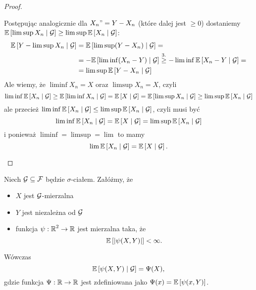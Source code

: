 \begin{proof}
\begin{enumerate}
      Postępując analogicznie dla $X_n"=Y-X_n$ (które dalej jest $\geq0$) dostaniemy $\expected{\limsup X_n}{\set{G}}\geq\limsup\expected{X_n}{\set{G}}$:
      \begin{align*}
        \expected{Y-\limsup X_n}{\set{G}}&=\expected{\limsup(Y-X_n)}{\set{G}}=\\
                                         &=-\expected{\liminf(X_n-Y)}{\set{G}}\overset{3.}{\geq}-\liminf\expected{X_n-Y}{\set{G}}=\\
                                         &=\limsup\expected{Y-X_n}{\set{G}}
      \end{align*}
      Ale wiemy, że $\liminf X_n=X$ oraz $\limsup X_n=X$, czyli
      $$\liminf\expected{X_n}{\set{G}}\geq\expected{\liminf X_n}{\set{G}}=\expected{X}{\set{G}}=\expected{\limsup{X_n}}{\set{G}}\geq\limsup\expected{X_n}{\set{G}}$$
      ale przecież $\liminf\expected{X_n}{\set{G}}\leq\limsup\expected{X_n}{\set{G}}$, czyli musi być
      $$\liminf\expected{X_n}{\set{G}}=\expected{X}{\set{G}}=\limsup\expected{X_n}{\set{G}}$$
      i ponieważ $\liminf=\limsup=\lim$ to mamy
      $$\lim\expected{X_n}{\set{G}}=\expected{X}{\set{G}}.$$
  \end{enumerate}
\end{proof}

\begin{theorem}\label{2.6 twierdzenie}
  Niech $\mathcal{G}\subseteq\mathcal{F}$ będzie $\sigma$-ciałem. Załóżmy, że
  \begin{itemize}
    \item $X$ jest $\mathcal{G}$-mierzalna
    \item $Y$ jest niezależna od $\mathcal{G}$
    \item funkcja $\psi:\operatorname{\mathbb{R}}^2\to\operatorname{\mathbb{R}}$ jest mierzalna taka, że
      $$\expected{|\psi(X,Y)|}<\infty.$$
  \end{itemize}
  Wówczas 
  $$\expected{\psi(X,Y)}{\set{G}}=\Psi(X),$$ 
  gdzie funkcja $\Psi:\operatorname{\mathbb{R}}\to\operatorname{\mathbb{R}}$ jest zdefiniowana jako $\Psi(x)=\expected{\psi(x,Y)}$.
\end{theorem}

